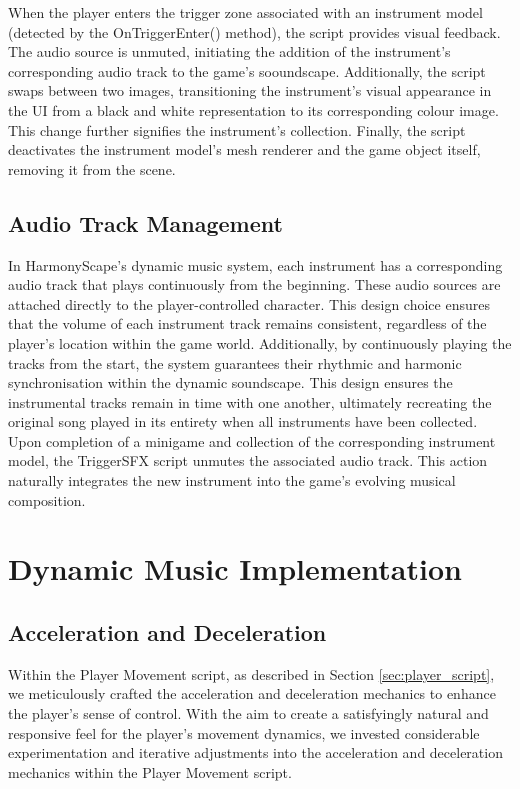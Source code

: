 \documentclass{l4proj}
\begin{document}
When the player enters the trigger zone associated with an instrument model (detected by the OnTriggerEnter() method), the script provides visual feedback. The audio source is unmuted, initiating the addition of the instrument's corresponding audio track to the game's sooundscape. Additionally, the script swaps between two images, transitioning the instrument's visual appearance in the UI from a black and white representation to its corresponding colour image. This change further signifies the instrument's collection. Finally, the script deactivates the instrument model's mesh renderer and the game object itself, removing it from the scene.

\subsection{Audio Track Management}
In HarmonyScape's dynamic music system, each instrument has a corresponding audio track that plays continuously from the beginning. These audio sources are attached directly to the player-controlled character. This design choice ensures that the volume of each instrument track remains consistent, regardless of the player's location within the game world.  Additionally, by continuously playing the tracks from the start, the system guarantees their rhythmic and harmonic synchronisation within the dynamic soundscape. This design ensures the instrumental tracks remain in time with one another, ultimately recreating the original song played in its entirety when all instruments have been collected. Upon completion of a minigame and collection of the corresponding instrument model, the TriggerSFX script unmutes the associated audio track. This action naturally integrates the new instrument into the game's evolving musical composition.

\section{Dynamic Music Implementation}

\subsection{Acceleration and Deceleration}
Within the Player Movement script, as described in Section \ref{sec:player_script}, we meticulously crafted the acceleration and deceleration mechanics to enhance the player's sense of control. With the aim to create a satisfyingly natural and responsive feel for the player's movement dynamics, we invested considerable experimentation and iterative adjustments into the acceleration and deceleration mechanics within the Player Movement script.
\end{document}
